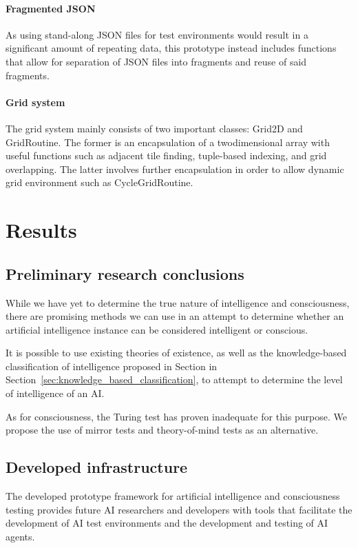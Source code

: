 \documentclass[masterthesis]{fer}
\begin{document}
\subsubsection{Fragmented JSON}
As using stand-along JSON files for test environments would result in a significant amount of repeating data,
this prototype instead includes functions that allow for separation of JSON files into fragments and reuse of said fragments.

\subsubsection{Grid system}
The grid system mainly consists of two important classes: Grid2D and GridRoutine.
The former is an encapsulation of a twodimensional array with useful functions such as adjacent tile finding, tuple-based indexing, and grid overlapping.
The latter involves further encapsulation in order to allow dynamic grid environment such as CycleGridRoutine.
\chapter{Results}
\label{sec:results}
\section{Preliminary research conclusions}
While we have yet to determine the true nature of intelligence and consciousness, there are promising methods we can use in an attempt to determine whether an artificial intelligence instance can be considered intelligent or conscious.

It is possible to use existing theories of existence, as well as the knowledge-based classification of intelligence proposed in Section in Section~\ref{sec:knowledge_based_classification}, to attempt to determine the level of intelligence of an AI. 

As for consciousness, the Turing test has proven inadequate for this purpose. We propose the use of mirror tests and theory-of-mind tests as an alternative.

\section{Developed infrastructure}
The developed prototype framework for artificial intelligence and consciousness testing provides future AI researchers and developers with tools that facilitate the development of AI test environments and the development and testing of AI agents. 
\end{document}
